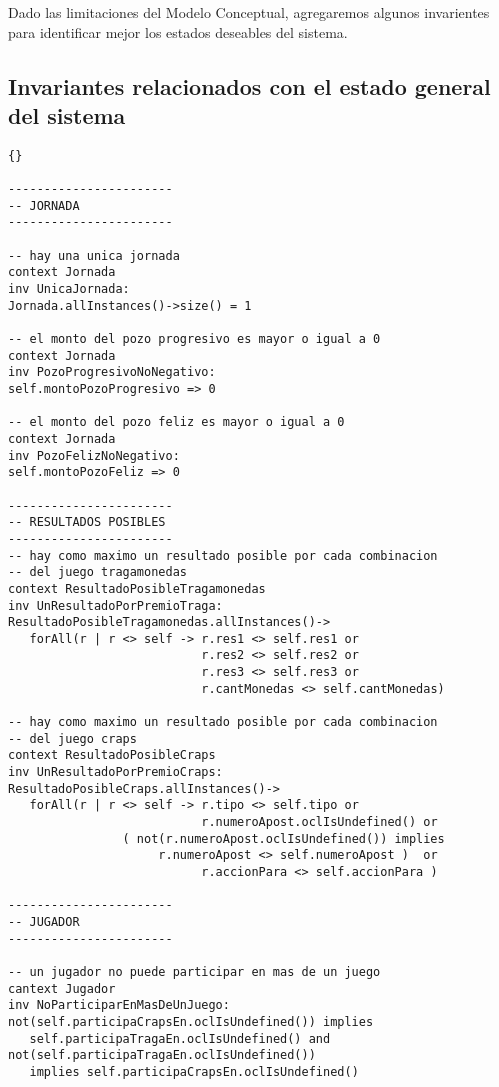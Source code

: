 
\begin{framed}
\depto Dado las limitaciones del Modelo Conceptual, agregaremos algunos invarientes para identificar mejor los estados deseables del sistema.

\subsection{Invariantes relacionados con el estado general del sistema}
\lstset{language=ocl}
\lstset{commentstyle=\textit}
\begin{lstlisting}[frame=trbl]{}

-----------------------
-- JORNADA
-----------------------

-- hay una unica jornada
context Jornada
inv UnicaJornada:
Jornada.allInstances()->size() = 1

-- el monto del pozo progresivo es mayor o igual a 0
context Jornada
inv PozoProgresivoNoNegativo:
self.montoPozoProgresivo => 0

-- el monto del pozo feliz es mayor o igual a 0
context Jornada
inv PozoFelizNoNegativo:
self.montoPozoFeliz => 0

-----------------------
-- RESULTADOS POSIBLES
-----------------------
-- hay como maximo un resultado posible por cada combinacion 
-- del juego tragamonedas
context ResultadoPosibleTragamonedas
inv UnResultadoPorPremioTraga:
ResultadoPosibleTragamonedas.allInstances()->
   forAll(r | r <> self -> r.res1 <> self.res1 or
                           r.res2 <> self.res2 or
                           r.res3 <> self.res3 or
                           r.cantMonedas <> self.cantMonedas)

-- hay como maximo un resultado posible por cada combinacion 
-- del juego craps
context ResultadoPosibleCraps
inv UnResultadoPorPremioCraps:
ResultadoPosibleCraps.allInstances()->
   forAll(r | r <> self -> r.tipo <> self.tipo or
                           r.numeroApost.oclIsUndefined() or
                ( not(r.numeroApost.oclIsUndefined()) implies
                     r.numeroApost <> self.numeroApost )  or
                           r.accionPara <> self.accionPara )

-----------------------
-- JUGADOR
-----------------------

-- un jugador no puede participar en mas de un juego
cantext Jugador
inv NoParticiparEnMasDeUnJuego:
not(self.participaCrapsEn.oclIsUndefined()) implies 
   self.participaTragaEn.oclIsUndefined() and
not(self.participaTragaEn.oclIsUndefined()) 
   implies self.participaCrapsEn.oclIsUndefined()


\end{lstlisting}
\end{framed}
